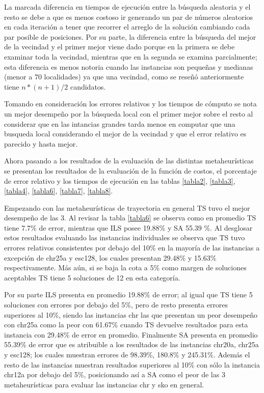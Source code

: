 \documentclass{ci5652}
\begin{document}
La marcada diferencia en tiempos de ejecución entre la búsqueda aleatoria y el resto se debe a que es menos costoso ir generando un par de números aleatorios en cada iteración a tener que recorrer el arreglo de la solución cambiando cada par posible de posiciones. Por su parte, la diferencia entre la búsqueda del mejor de la vecindad y el primer mejor viene dado porque en la primera se debe examinar toda la vecindad, mientras que en la segunda se examina parcialmente; esta diferencia es menos notoria cuando las instancias son pequeñas y medianas (menor a 70 localidades) ya que una vecindad, como se reseñó anteriormente tiene $n*(n+1)/2$ candidatos.

Tomando en consideración los errores relativos y los tiempos de cómputo se nota un mejor desempeño por la búsqueda local con el primer mejor sobre el resto al considerar que en las intancias grandes tarda menos en computar que una busqueda local considerando el mejor de la vecindad y que el error relativo es parecido y hasta mejor.

Ahora pasando a los resultados de la evaluación de las distintas metaheurísticas se presentan los resultados de la evaluación de la función de costos, el porcentaje de error relativo y los tiempos de ejecución en las tablas \ref{tabla2}, \ref{tabla3}, \ref{tabla4}, \ref{tabla6}, \ref{tabla7}, \ref{tabla8}.

Empezando con las metaheurísticas de trayectoria en general TS tuvo el mejor desempeño de las 3. Al revisar la tabla \ref{tabla6} se observa como en promedio TS tiene 7.7\% de error, mientras que ILS posee 19.88\% y SA 55.39 \%. Al desglosar estos resultados evaluando las instancias individuales se observa que TS tuvo errores relativos consistentes por debajo del 10\% en la mayoría de las instancias a excepción de chr25a y esc128, los cuales presentan 29.48\% y 15.63\% respectivamente. Más aún, si se baja la cota a 5\% como margen de soluciones aceptables TS tiene 5 soluciones de 12 en esta categoría.

Por su parte ILS presenta en promedio 19.88\% de error; al igual que TS tiene 5 soluciones con errores por debajo del 5\%, pero de resto presenta errores superiores al 10\%, siendo las instancias chr las que presentan un peor desempeño con chr25a como la peor con 61.67\% cuando TS devuelve resultados para esta instancia con 29.48\% de error en promedio. Finalmente SA presenta en promedio 55.39\% de error que es atribuible a los resultados de las instancias chr20a, chr25a y esc128; los cuales muestran errores de 98.39\%, 180.8\% y 245.31\%. Además el resto de las instancias muestran resultados superiores al 10\% con sólo la instancia chr12a por debajo del 5\%, posicionando así a SA como el peor de las 3 metaheurísticas para evaluar las instancias chr y sko en general. 
\end{document}
